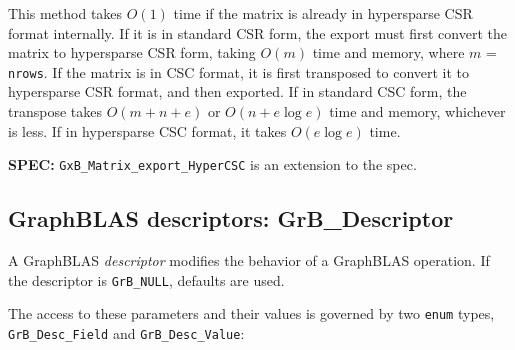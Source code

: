 \documentclass[12pt]{article}
\begin{document}
This method takes $O(1)$ time if the matrix is already in hypersparse CSR
format internally.  If it is in standard CSR form, the export must first
convert the matrix to hypersparse CSR form, taking $O(m)$ time and memory,
where $m$ = \verb'nrows'.  If the matrix is in CSC format, it is first
transposed to convert it to hypersparse CSR format, and then exported.  If in
standard CSC form, the transpose takes $O(m+n+e)$ or $O(n + e \log e)$ time and
memory, whichever is less.  If in hypersparse CSC format, it takes $O(e \log
e)$ time.

\begin{spec}
{\bf SPEC:} \verb'GxB_Matrix_export_HyperCSC' is an extension to the spec.
\end{spec}

\newpage
\subsection{GraphBLAS descriptors: {\sf GrB\_Descriptor}} %
\label{descriptor}

A GraphBLAS {\em descriptor} modifies the behavior of a GraphBLAS operation.
If the descriptor is \verb'GrB_NULL', defaults are used.

The access to these parameters and their values is governed
by two \verb'enum' types, \verb'GrB_Desc_Field' and \verb'GrB_Desc_Value':
\end{document}
